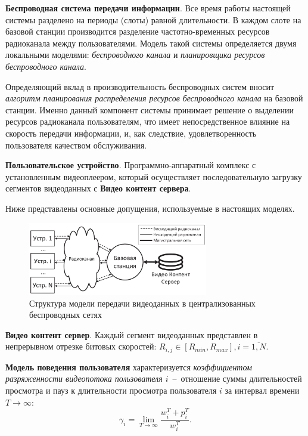 \textbf{Беспроводная система передачи информации}. Все время работы настоящей системы разделено на периоды (слоты) равной длительности. В каждом слоте на базовой станции производится разделение частотно-временных ресурсов радиоканала между пользователями. Модель такой системы определяется двумя локальными моделями: \textit{беспроводного канала} и \textit{планировщика ресурсов беспроводного канала}.

Определяющий вклад в производительность беспроводных систем вносит \textit{алгоритм планирования распределения ресурсов беспроводного канала} на базовой станции. Именно данный компонент системы принимает решение о выделении ресурсов радиоканала пользователям, что имеет непосредственное влияние на скорость передачи информации, и, как следствие, удовлетворенность пользователя качеством обслуживания.

\textbf{Пользовательское устройство}. Программно-аппаратный комплекс с установленным видеоплеером, который осуществляет последовательную загрузку сегментов видеоданных с \textbf{Видео контент сервера}.

Ниже представлены основные допущения, используемые в настоящих моделях.  

\begin{figure}[htbp]
\begin{center}
\includegraphics[width=0.7\textwidth]{../Dissertation/images/Chapter2/SystemModel.pdf}
\caption{Структура модели передачи видеоданных в централизованных беспроводных сетях}
\label{fig:SystemModel}
\end{center}
\end{figure}

\textbf{Видео контент сервер}. Каждый сегмент видеоданных представлен в непрерывном отрезке битовых скоростей: $R_{i,j} \in [R_{min}, R_{max}], i=\overline{1,N}$.

\textbf{Модель поведения пользователя} характеризуется \textit{коэффициентом разряженности видеопотока пользователя $i$}~--~отношение суммы длительностей просмотра и пауз к длительности просмотра пользователя $i$ за интервал времени $T\rightarrow\infty$:
$$\gamma_i = \lim\limits_{T\rightarrow\infty} \frac{w_i^T + p_i^T}{w_i^T}.$$


